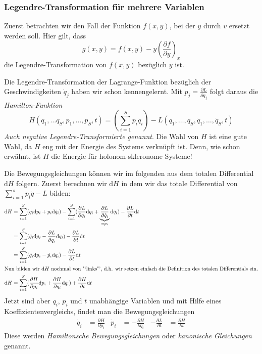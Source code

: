 \documentclass[oneside]{book}
\theoremstyle{definition}
\renewcommand{\d}{\mathrm d}
\newcommand{\md}{\d}
\begin{document}
\subsubsection{Legendre-Transformation für mehrere Variablen}
Zuerst betrachten wir den Fall der Funktion $f(x,y)$, bei der $y$ durch $v$ ersetzt werden soll. Hier gilt, dass
\[g(x,y) = f(x,y) - y(\frac{\partial f}{\partial y})_x\]
die Legendre-Transformation von $f(x,y)$ bezüglich $y$ ist.

Die Legendre-Transformation der Lagrange-Funktion bezüglich der Geschwindigkeiten $\dot q_j$ haben wir schon kennengelernt. Mit $p_j = \frac{\partial L}{\partial \dot q_j}$ folgt daraus die \emph{Hamilton-Funktion}
\[H(q_1,\ldots q_S,  p_1,\ldots, p_S,t) = (\sum\limits_{i=1}^S p_i \dot q_i) - L(q_1, \ldots,q_S, \dot q_1, \ldots, \dot q_S, t)\]
\textit{Auch negative Legendre-Transformierte genannt}.
Die Wahl von $H$ ist eine gute Wahl, da $H$ eng mit der Energie des Systems verknüpft ist. Denn, wie schon erwähnt, ist $H$ die Energie für holonom-skleronome Systeme!

Die Bewegungsgleichungen können wir im folgenden aus dem totalen Differential $\md H$ folgern.
Zuerst berechnen wir $\d H$ in dem wir das totale Differential von $\sum_{i=1}^s p_i \dot{q} - L$ bilden:
\begin{align*}
\md H &= \sum\limits_{i=1}^S (\dot q_i \md p_i + p_i \md \dot q_i) - \sum\limits_{i=1}^S (\frac{\partial L}{\partial q_i} \md q_i + \underbrace{\frac{\partial L}{\partial \dot q_i}}_{=p_i} \md \dot q_i) - \frac{\partial L}{\partial t} \md t\\
&=\sum\limits_{i=1}^S(\dot q_i \md p_i - \frac{\partial L}{\partial q_i}\md q_i) - \frac{\partial L}{\partial t}\md t\\
&=\sum\limits_{i=1}^S(\dot q_i \md p_i - \dot p_i\md q_i) - \frac{\partial L}{\partial t}\md t\\
\intertext{Nun bilden wir $\d H$ nochmal von "`links"', d.h. wir setzen einfach die Definition des totalen Differentials ein.}
\d H &= \sum\limits_{i=1}^S(\frac{\partial H}{\partial p_i}\md p_i + \frac{\partial H}{\partial q_i}\md q_i) + \frac{\partial H}{\partial t}\md t\\
\end{align*}
Jetzt sind aber $q_i$, $p_i$ und $t$ unabhängige Variablen und mit Hilfe eines Koeffizientenvergleichs, findet man die Bewegungsgleichungen
\begin{align*}
\dot q_i &= \frac{\partial H}{\partial p_i} & \dot p_i &= - \frac{\partial H}{\partial q_i} & -\frac{\partial L}{\partial t} &= \frac{\partial H}{\partial t}
\end{align*}
Diese werden \emph{Hamiltonsche Bewegungsgleichungen} oder \emph{kanonische Gleichungen} genannt.
\end{document}
